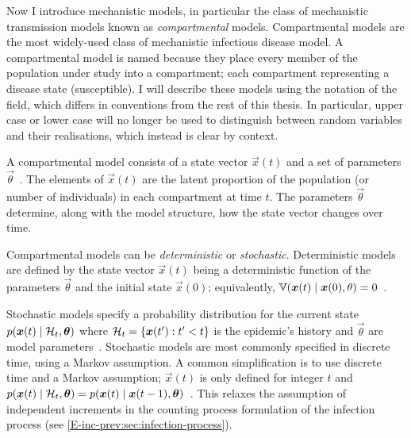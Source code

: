 \documentclass[thesis.tex]{subfiles}
\begin{document}
Now I introduce mechanistic models, in particular the class of mechanistic transmission models known as \emph{compartmental} models.
Compartmental models are the most widely-used class of mechanistic infectious disease model.
A compartmental model is named because they place every member of the population under study into a compartment; each compartment representing a disease state (\eg susceptible).
I will describe these models using the notation of the field, which differs in conventions from the rest of this thesis.
In particular, upper case or lower case will no longer be used to distinguish between random variables and their realisations, which instead is clear by context.

A compartmental model consists of a state vector $\vec{x}(t)$ and a set of parameters $\vec{\theta}$~\autocite{birrellEvidence,dukicTracking,corbellaThesis}.
The elements of $\vec{x}(t)$ are the latent proportion of the population (or number of individuals) in each compartment at time $t$.
The parameters $\vec{\theta}$ determine, along with the model structure, how the state vector changes over time.

Compartmental models can be \emph{deterministic} or \emph{stochastic}.
Deterministic models are defined by the state vector $\vec{x}(t)$ being a deterministic function of the parameters $\vec{\theta}$ and the initial state $\vec{x}(0)$; equivalently, $\operatorname{\mathbb{V}}(\bm{x}(t) \mid \bm{x}(0), \theta) = 0$~\autocite{birrellEvidence}.

Stochastic models specify a probability distribution for the current state $p(\bm{x}(t) \mid \mathcal{H}_t, \bm{\theta})$ where $\mathcal{H}_t = \{ \bm{x}(t') : t' < t \}$ is the epidemic's history and $\vec{\theta}$ are model parameters~\autocite{birrellEvidence,dukicTracking,corbellaThesis,keelingModeling}.
Stochastic models are most commonly specified in discrete time, using a Markov assumption.
A common simplification is to use discrete time and a Markov assumption; \ie $\vec{x}(t)$ is only defined for integer $t$ and $p(\bm{x}(t) \mid \mathcal{H}_t, \bm{\theta}) = p(\bm{x}(t) \mid \bm{x}(t-1), \bm{\theta})$~\autocite{birrellEvidence}.
This relaxes the assumption of independent increments in the counting process formulation of the infection process (see \cref{E-inc-prev:sec:infection-process}).
\end{document}
